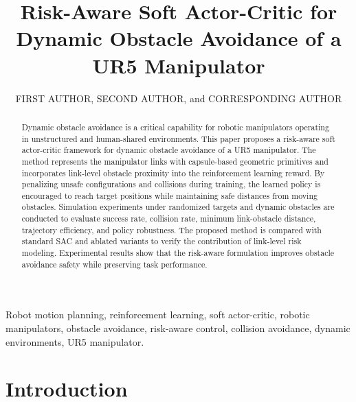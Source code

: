 \documentclass{ieeeaccess}
\begin{document}

\title{Risk-Aware Soft Actor-Critic for Dynamic Obstacle Avoidance of a UR5 Manipulator}

\author{\uppercase{First Author},
\uppercase{Second Author}, and
\uppercase{Corresponding Author}}

\address[1]{School/College, Shanghai University, Shanghai, China}


\begin{abstract}
Dynamic obstacle avoidance is a critical capability for robotic manipulators operating in unstructured and human-shared environments.
This paper proposes a risk-aware soft actor-critic framework for dynamic obstacle avoidance of a UR5 manipulator.
The method represents the manipulator links with capsule-based geometric primitives and incorporates link-level obstacle proximity into the reinforcement learning reward.
By penalizing unsafe configurations and collisions during training, the learned policy is encouraged to reach target positions while maintaining safe distances from moving obstacles.
Simulation experiments under randomized targets and dynamic obstacles are conducted to evaluate success rate, collision rate, minimum link-obstacle distance, trajectory efficiency, and policy robustness.
The proposed method is compared with standard SAC and ablated variants to verify the contribution of link-level risk modeling.
Experimental results show that the risk-aware formulation improves obstacle avoidance safety while preserving task performance.
\end{abstract}

\begin{keywords}
Robot motion planning, reinforcement learning, soft actor-critic, robotic manipulators, obstacle avoidance, risk-aware control, collision avoidance, dynamic environments, UR5 manipulator.
\end{keywords}

\titlepgskip=-15pt
\maketitle

\section{Introduction}
\label{sec:introduction}
\end{document}
